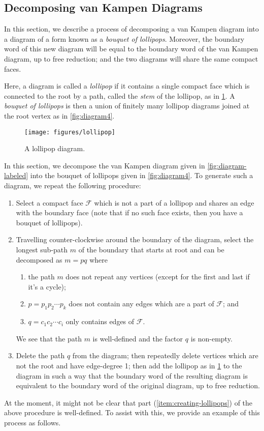 \documentclass[11pt,a4paper,reqno]{amsart}
\theoremstyle{plain}
\theoremstyle{definition}
\theoremstyle{definition}
\begin{document}
\subsection{Decomposing van Kampen Diagrams}\label{sec:van-kampen-decomp}

In this section, we describe a process of decomposing a van Kampen diagram into a diagram of a form known as a \emph{bouquet of lollipops}.
Moreover, the boundary word of this new diagram will be equal to the boundary word of the van Kampen diagram, up to free reduction; and the two diagrams will share the same compact faces.

Here, a diagram is called a \emph{lollipop} if it contains a single compact face which is connected to the root by a path, called the \emph{stem} of the lollipop, as in \cref{fig:lollipop}.
A \emph{bouquet of lollipops} is then a union of finitely many lollipop diagrams joined at the root vertex as in \cref{fig:diagram4}.

\begin{figure}[ht!]
	\centering
	\texttt{[image: figures/lollipop]}
	\caption{A lollipop diagram.}\label{fig:lollipop}
\end{figure}

In this section, we decompose the van Kampen diagram given in \cref{fig:diagram-labeled} into the bouquet of lollipops given in \cref{fig:diagram4}.
To generate such a diagram, we repeat the following procedure:
\begin{enumerate}
  \item Select a compact face $\mathcal F$ which is not a part of a lollipop and shares an edge with the boundary face (note that if no such face exists, then you have a bouquet of lollipops).
  \item Travelling counter-clockwise around the boundary of the diagram, select the longest sub-path $m$ of the boundary that starts at root and can be decomposed as $m = pq$ where
    \begin{enumerate}
      \item the path $m$ does not repeat any vertices (except for the first and last if it's a cycle);
      \item $p = p_1p_2\cdots p_k$ does not contain any edges which are a part of $\mathcal F$; and
      \item $q=c_1 c_2\cdots c_i$ only contains edges of $\mathcal F$.
    \end{enumerate}
    We see that the path $m$ is well-defined and the factor $q$ is non-empty.
  \item\label{item:creating-lollipops} Delete the path $q$ from the diagram; then repeatedly delete vertices which are not the root and have edge-degree 1; then add the lollipop as in \cref{fig:lollipop} to the diagram in such a way that the boundary word of the resulting diagram is equivalent to the boundary word of the original diagram, up to free reduction.
\end{enumerate}
At the moment, it might not be clear that part (\ref{item:creating-lollipops}) of the above procedure is well-defined.
To assist with this, we provide an example of this process as follows.
\end{document}
